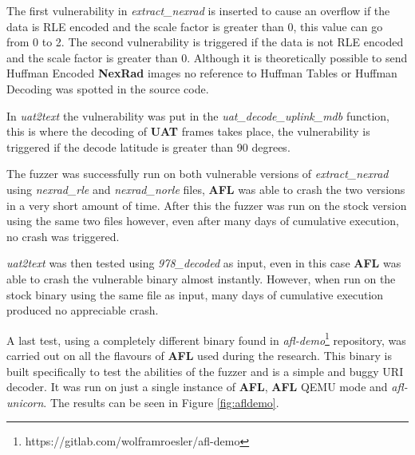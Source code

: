 \documentclass[../main.tex]{subfiles}
\begin{document}
The first vulnerability in \textit{extract\_nexrad} is inserted to cause an
overflow if the data is RLE encoded and the scale factor is greater than 0, this
value can go from 0 to 2. The second vulnerability is triggered if the data is
not RLE encoded and the scale factor is greater than 0. Although it is
theoretically possible to send Huffman Encoded \textbf{NexRad} images no
reference to Huffman Tables or Huffman Decoding was spotted in the source code.

In \textit{uat2text} the vulnerability was put in the
\textit{uat\_decode\_uplink\_mdb} function, this is where the decoding of
\textbf{UAT} frames takes place, the vulnerability is triggered if the decode
latitude is greater than 90 degrees.

The fuzzer was successfully run on both vulnerable versions of
\textit{extract\_nexrad} using \textit{nexrad\_rle} and \textit{nexrad\_norle}
files, \textbf{AFL} was able to crash the two versions in a very short amount of
time. After this the fuzzer was run on the stock version using the same two
files however, even after many days of cumulative execution, no crash was
triggered.

\textit{uat2text} was then tested using \textit{978\_decoded} as input, even in
this case \textbf{AFL} was able to crash the vulnerable binary almost instantly.
However, when run on the stock binary using the same file as input, many days of
cumulative execution produced no appreciable crash.

A last test, using a completely different binary found in
\textit{afl-demo}\footnote{https://gitlab.com/wolframroesler/afl-demo}
repository, was carried out on all the flavours of \textbf{AFL} used during the
research. This binary is built specifically to test the abilities of the fuzzer
and is a simple and buggy URI decoder. It was run on just a single instance of
\textbf{AFL}, \textbf{AFL} QEMU mode and \textit{afl-unicorn}. The results can
be seen in Figure \ref{fig:afldemo}.
\end{document}
